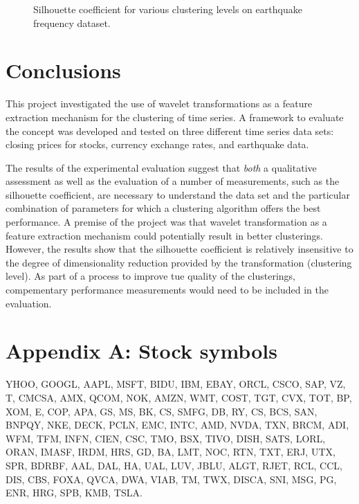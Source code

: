 \documentclass{article}
\begin{document}
\begin{figure}
\begin{center}
\caption{Silhouette coefficient for various clustering levels on earthquake frequency dataset.} \label{silhouette_score_eq}
\end{center}
\end{figure}

\section{Conclusions}

This project investigated the use of wavelet transformations as a feature extraction mechanism for the clustering of time series. A framework to evaluate the concept was developed and tested on three different time series data sets: closing prices for stocks, currency exchange rates, and earthquake data.

The results of the experimental evaluation suggest that {\em both} a qualitative assessment as well as the evaluation of a number of measurements, such as the silhouette coefficient, are necessary to understand the data set and the particular combination of parameters for which a clustering algorithm offers the best performance. A premise of the project was that wavelet transformation as a feature extraction mechanism could potentially result in better clusterings. However, the results show that the silhouette coefficient is relatively insensitive to the degree of dimensionality reduction provided by the transformation (clustering level). As part of a process to improve tue quality of the clusterings, compementary performance measurements would need to be included in the evaluation.


\appendix
\section*{Appendix A: Stock symbols}
\label{AppA}

YHOO, GOOGL, AAPL, MSFT, BIDU, IBM, EBAY, ORCL, CSCO, SAP, VZ, T, CMCSA, AMX, QCOM, NOK, AMZN, WMT, COST, TGT, CVX, TOT, BP, XOM, E, COP, APA, GS, MS, BK, CS, SMFG, DB, RY, CS, BCS, SAN, BNPQY, NKE, DECK, PCLN, EMC, INTC, AMD, NVDA, TXN, BRCM, ADI, WFM, TFM, INFN, CIEN, CSC, TMO, BSX, TIVO, DISH, SATS, LORL, ORAN, IMASF, IRDM, HRS, GD, BA, LMT, NOC, RTN, TXT, ERJ, UTX, SPR, BDRBF, AAL, DAL, HA, UAL, LUV, JBLU, ALGT, RJET, RCL, CCL, DIS, CBS, FOXA, QVCA, DWA, VIAB, TM, TWX, DISCA, SNI, MSG, PG, ENR, HRG, SPB, KMB, TSLA.
\end{document}
